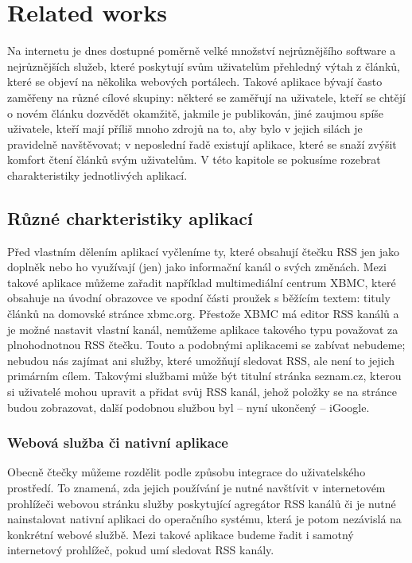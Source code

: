 \chapter{Related works}


Na internetu je dnes dostupné poměrně velké množství nejrůznějšího software a nejrůznějších služeb, které poskytují svům uživatelům přehledný výtah z článků, které se objeví na několika webových portálech.
Takové aplikace bývají často zaměřeny na různé cílové skupiny: některé se zaměřují na uživatele, kteří se chtějí o novém článku dozvědět okamžitě, jakmile je publikován, jiné zaujmou spíše uživatele, kteří mají příliš mnoho zdrojů na to, aby bylo v jejich silách je pravidelně navštěvovat; v neposlední řadě existují aplikace, které se snaží zvýšit komfort čtení článků svým uživatelům.
V této kapitole se pokusíme rozebrat charakteristiky jednotlivých aplikací.

\section{Různé charkteristiky aplikací}

Před vlastním dělením aplikací vyčleníme ty, které obsahují čtečku RSS jen jako doplněk nebo ho využívají (jen) jako informační kanál o svých změnách.
Mezi takové aplikace můžeme zařadit například multimediální centrum XBMC, které obsahuje na úvodní obrazovce ve spodní části proužek s běžícím textem: tituly článků na domovské stránce xbmc.org.
Přestože XBMC má editor RSS kanálů a je možné nastavit vlastní kanál, nemůžeme aplikace takového typu považovat za plnohodnotnou RSS čtečku.
Touto a podobnými aplikacemi se zabívat nebudeme; nebudou nás zajímat ani služby, které umožňují sledovat RSS, ale není to jejich primárním cílem.
Takovými službami může být titulní stránka seznam.cz, kterou si uživatelé mohou upravit a přidat svůj RSS kanál, jehož položky se na stránce budou zobrazovat, další podobnou službou byl -- nyní ukončený -- iGoogle.

\subsection{Webová služba či nativní aplikace}


Obecně čtečky můžeme rozdělit podle způsobu integrace do uživatelského prostředí.
To znamená, zda jejich používání je nutné navštívit v internetovém prohlížeči webovou stránku služby poskytující agregátor RSS kanálů či je nutné nainstalovat nativní aplikaci do operačního systému, která je potom nezávislá na konkrétní webové službě.
Mezi takové aplikace budeme řadit i samotný internetový prohlížeč, pokud umí sledovat RSS kanály.

